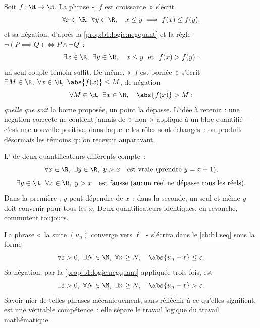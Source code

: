 \begin{example}\label{ex:b1:logic:negpractice}
Soit $f \colon \R \to \R$. La phrase «~$f$ est croissante~» s'écrit
\[
\forall x \in \R,\ \forall y \in \R,\quad
x \leq y \implies f(x) \leq f(y) ,
\]
et sa négation, d'après la \cref{prop:b1:logic:negquant} et la règle
$\lnot(P \implies Q) \iff P \land \lnot Q$~:
\[
\exists x \in \R,\ \exists y \in \R,\quad
x \leq y \ \text{ et }\ f(x) > f(y) :
\]
un seul couple témoin suffit. De même, «~$f$ est bornée~» s'écrit
$\exists M \in \R,\ \forall x \in \R,\ \abs{f(x)} \leq M$, de négation
\[
\forall M \in \R,\ \exists x \in \R,\quad \abs{f(x)} > M :
\]
\emph{quelle que soit} la borne proposée, un point la dépasse. L'idée à
retenir~: une négation correcte ne contient jamais de «~non~» appliqué à
un bloc quantifié --- c'est une nouvelle  positive, dans
laquelle les rôles sont échangés~: on produit désormais les témoins
qu'on recevait auparavant.
\end{example}

\begin{example}\label{ex:b1:logic:order}
L' de deux quantificateurs différents compte~:
\[
\forall x \in \R,\ \exists y \in \R,\ y > x
\quad\text{est vraie (prendre } y = x+1\text{),}
\]
\[
\exists y \in \R,\ \forall x \in \R,\ y > x
\quad\text{est fausse (aucun réel ne dépasse tous les réels).}
\]
Dans la première , $y$ peut dépendre de $x$~; dans la seconde,
un seul et même $y$ doit convenir pour tous les $x$. Deux
quantificateurs identiques, en revanche, commutent toujours.
\end{example}

\begin{example}\label{ex:b1:logic:limit}
La phrase «~la suite $(u_n)$ converge vers $\ell$~» s'écrira dans le
\cref{ch:b1:seq} sous la forme
\[
\forall \varepsilon > 0,\ \exists N \in \N,\ \forall n \geq N,\quad
\abs{u_n - \ell} \leq \varepsilon .
\]
Sa négation, par la \cref{prop:b1:logic:negquant} appliquée trois fois, est
\[
\exists \varepsilon > 0,\ \forall N \in \N,\ \exists n \geq N,\quad
\abs{u_n - \ell} > \varepsilon .
\]
Savoir nier de telles phrases mécaniquement, sans réfléchir à ce
qu'elles signifient, est une véritable compétence~: elle sépare le
travail logique du travail mathématique.
\end{example}

